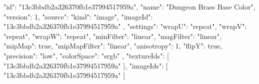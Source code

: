 {
  "id": "13c3bbdb2a326370fb1e37994517959a",
  "name": "Dungeon Brass Base Color",
  "version": 1,
  "source": {
    "kind": "image",
    "imageId": "13c3bbdb2a326370fb1e37994517959a"
  },
  "settings": {
    "wrapU": "repeat",
    "wrapV": "repeat",
    "wrapW": "repeat",
    "minFilter": "linear",
    "magFilter": "linear",
    "mipMap": true,
    "mipMapFilter": "linear",
    "anisotropy": 1,
    "flipY": true,
    "precision": "low",
    "colorSpace": "srgb"
  },
  "textureIds": [
    "13c3bbdb2a326370fb1e37994517959a"
  ],
  "imageIds": [
    "13c3bbdb2a326370fb1e37994517959a"
  ]
}
